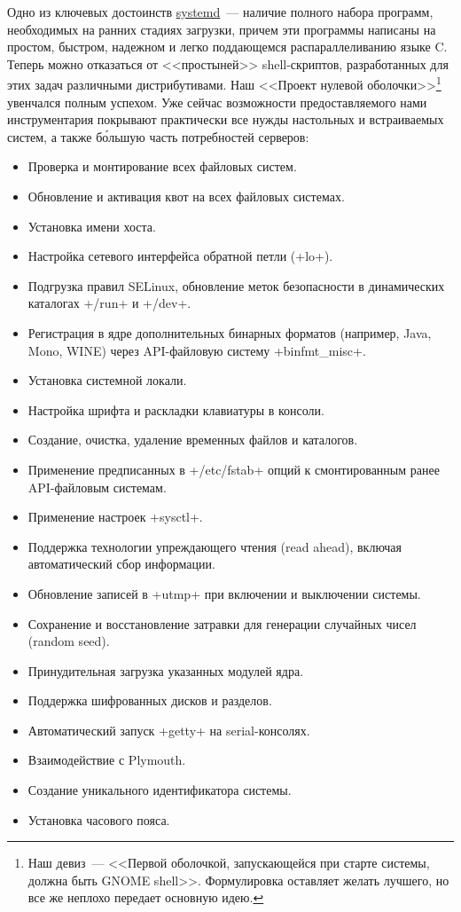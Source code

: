 \documentclass[10pt,oneside,a4paper]{article}
\begin{document}
Одно из ключевых достоинств
\href{http://www.freedesktop.org/wiki/Software/systemd}{systemd}~--- наличие
полного набора программ, необходимых на ранних стадиях загрузки, причем эти
программы написаны на простом, быстром, надежном и легко поддающемся
распараллеливанию языке C. Теперь можно отказаться от <<простыней>>
shell-скриптов, разработанных для этих задач различными дистрибутивами. Наш
<<Проект нулевой оболочки>>\footnote{Наш девиз~--- <<Первой оболочкой,
запускающейся при старте системы, должна быть GNOME shell>>. Формулировка
оставляет желать лучшего, но все же неплохо передает основную идею.} увенчался
полным успехом. Уже сейчас возможности предоставляемого нами инструментария
покрывают практически все нужды настольных и встраиваемых систем, а также
б\'{о}льшую часть потребностей серверов:
\begin{itemize}
	\item Проверка и монтирование всех файловых систем.
	\item Обновление и активация квот на всех файловых системах.
	\item Установка имени хоста.
	\item Настройка сетевого интерфейса обратной петли (+lo+).
	\item Подгрузка правил SELinux, обновление
		меток безопасности в динамических каталогах +/run+ и +/dev+.
	\item Регистрация в ядре дополнительных бинарных форматов (например,
		Java, Mono, WINE) через API-файловую систему +binfmt_misc+.
	\item Установка системной локали.
	\item Настройка шрифта и раскладки клавиатуры в консоли.
	\item Создание, очистка, удаление временных файлов и каталогов.
	\item Применение предписанных в +/etc/fstab+ опций к смонтированным
		ранее API-файловым системам.
	\item Применение настроек +sysctl+.
	\item Поддержка технологии упреждающего чтения (read ahead), включая
		автоматический сбор информации.
	\item Обновление записей в +utmp+ при включении и выключении системы.
	\item Сохранение и восстановление затравки для генерации случайных чисел
		(random seed).
	\item Принудительная загрузка указанных модулей ядра.
	\item Поддержка шифрованных дисков и разделов.
	\item Автоматический запуск +getty+ на serial-консолях.
	\item Взаимодействие с Plymouth.
	\item Создание уникального идентификатора системы.
	\item Установка часового пояса.
\end{itemize}
\end{document}
